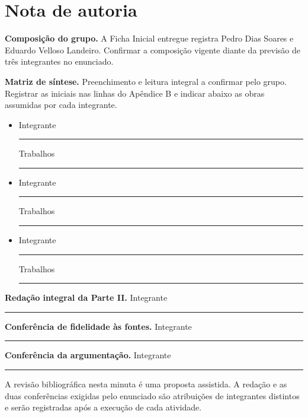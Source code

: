 \documentclass[12pt,a4paper]{article}
\begin{document}
\clearpage
\section{Nota de autoria}

\noindent\textbf{Composição do grupo.} A Ficha Inicial entregue registra Pedro Dias Soares e Eduardo Velloso Landeiro. Confirmar a composição vigente diante da previsão de três integrantes no enunciado.

\medskip
\noindent\textbf{Matriz de síntese.} Preenchimento e leitura integral a confirmar pelo grupo. Registrar as iniciais nas linhas do Apêndice B e indicar abaixo as obras assumidas por cada integrante.

\begin{itemize}
  \item Integrante \rule{5.7cm}{0.4pt} \quad Trabalhos \rule{2.5cm}{0.4pt}
  \item Integrante \rule{5.7cm}{0.4pt} \quad Trabalhos \rule{2.5cm}{0.4pt}
  \item Integrante \rule{5.7cm}{0.4pt} \quad Trabalhos \rule{2.5cm}{0.4pt}
\end{itemize}

\noindent\textbf{Redação integral da Parte II.} Integrante \rule{5.5cm}{0.4pt}

\medskip
\noindent\textbf{Conferência de fidelidade às fontes.} Integrante \rule{4.5cm}{0.4pt}

\medskip
\noindent\textbf{Conferência da argumentação.} Integrante \rule{5.7cm}{0.4pt}

\medskip
\noindent A revisão bibliográfica nesta minuta é uma proposta assistida. A redação e as duas conferências exigidas pelo enunciado são atribuições de integrantes distintos e serão registradas após a execução de cada atividade.
\end{document}
